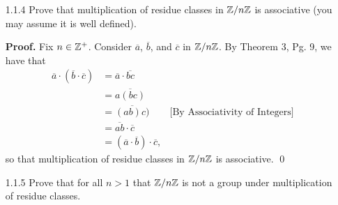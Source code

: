 \begin{enumerate}
      \textbf{Proof.} Fix $n \in \Z^+$. Consider $\overline{a}$, $\overline{b}$,
      and $\overline{c}$ in $\Z/n\Z$. By Theorem 3, Pg. 9, we have that
      \begin{align*}
         \overline{a} + (\overline{b} + \overline{c})
            &= \overline{a} + \overline{(b + c)} \\
            &= \overline{a + (b + c)} \\
            &= \overline{(a + b) + c}
               &\text{[By Associativity of Integers]} \\
            &= \overline{(a + b)} + \overline{c} \\
            &= (\overline{a} + \overline{b}) + \overline{c},
      \end{align*}
      so that addition of residue classes in $\Z/n\Z$ is associative. \qed
   \item[1.1.4]   Prove that multiplication of residue classes in $\Z/n\Z$ is
                  associative (you may assume it is well defined).
                  
      \textbf{Proof.} Fix $n \in \Z^+$. Consider $\overline{a}$, $\overline{b}$,
      and $\overline{c}$ in $\Z/n\Z$. By Theorem 3, Pg. 9, we have that
      \begin{align*}
         \overline{a} \cdot (\overline{b} \cdot \overline{c})
            &= \overline{a} \cdot \overline{bc} \\
            &= \overline{a(bc)} \\
            &= \overline{(ab)c)} &\text{[By Associativity of Integers]} \\
            &= \overline{ab} \cdot \overline{c} \\
            &= (\overline{a} \cdot \overline{b}) \cdot \overline{c},
      \end{align*}
      so that multiplication of residue classes in $\Z/n\Z$ is associative. \qed
   \item[1.1.5]   Prove that for all $n > 1$ that $\Z/n\Z$ is not a group under
                  multiplication of residue classes.
                  

\end{enumerate}
